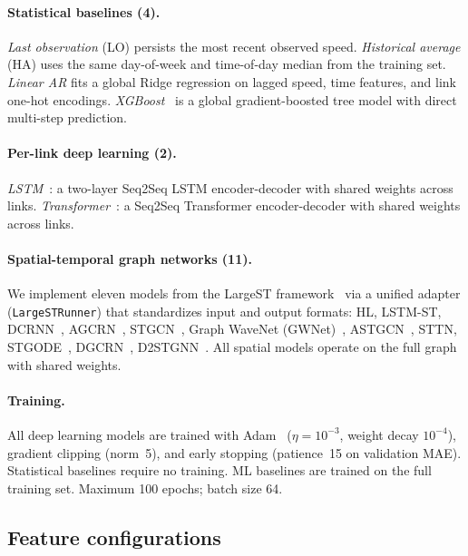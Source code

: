 \documentclass[a4paper]{cas-sc}
\begin{document}
\paragraph{Statistical baselines (4).}
\textit{Last observation} (LO) persists the most recent observed speed.
\textit{Historical average} (HA) uses the same day-of-week and
time-of-day median from the training set.
\textit{Linear AR} fits a global Ridge regression on lagged speed,
time features, and link one-hot encodings.
\textit{XGBoost}~\citep{chen2016xgboost} is a global gradient-boosted
tree model with direct multi-step prediction.

\paragraph{Per-link deep learning (2).}
\textit{LSTM}~\citep{hochreiter1997lstm}: a two-layer Seq2Seq LSTM
encoder-decoder with shared weights across links.
\textit{Transformer}~\citep{vaswani2017attention}: a Seq2Seq Transformer
encoder-decoder with shared weights across links.

\paragraph{Spatial-temporal graph networks (11).}
We implement eleven models from the LargeST framework~\citep{liu2024largest}
via a unified adapter (\texttt{LargeSTRunner}) that standardizes
input and output formats:
HL, LSTM-ST, DCRNN~\citep{li2018dcrnn},
AGCRN~\citep{bai2020adaptive}, STGCN~\citep{yu2018stgcn},
Graph WaveNet (GWNet)~\citep{wu2019gwnet},
ASTGCN~\citep{guo2021astgcn}, STTN, STGODE~\citep{fang2021stgode},
DGCRN~\citep{li2023dgcrn}, D2STGNN~\citep{liu2023d2stgnn}.
All spatial models operate on the full graph with shared weights.

\paragraph{Training.}
All deep learning models are trained with Adam~\citep{kingma2015adam} ($\eta = 10^{-3}$,
weight decay $10^{-4}$), gradient clipping (norm~5), and early
stopping (patience~15 on validation MAE).
Statistical baselines require no training. ML baselines are trained
on the full training set.
Maximum 100 epochs; batch size 64.

\subsection{Feature configurations}
\label{sec:feature_configs}
\end{document}
